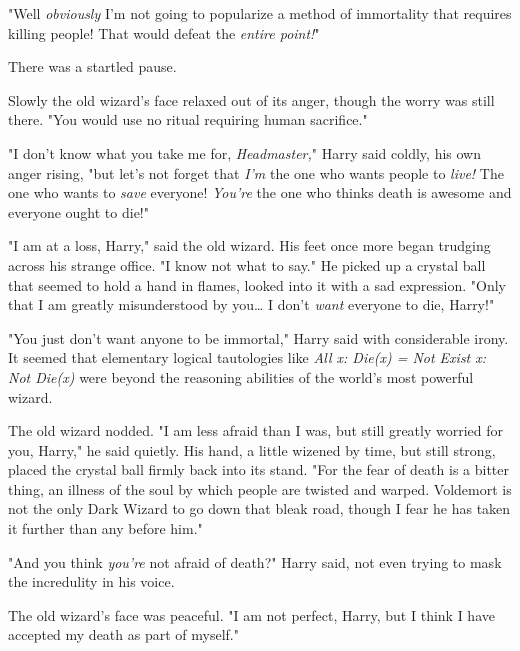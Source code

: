 "Well \emph{obviously} I'm not going to popularize a method of immortality that 
requires killing people! That would defeat the \emph{entire point!}"

There was a startled pause.

Slowly the old wizard's face relaxed out of its anger, though the worry was 
still there. "You would use no ritual requiring human sacrifice."

"I don't know what you take me for, \emph{Headmaster,}" Harry said coldly, his 
own anger rising, "but let's not forget that \emph{I'm} the one who wants 
people to \emph{live!} The one who wants to \emph{save} everyone! \emph{You're} 
the one who thinks death is awesome and everyone ought to die!"

"I am at a loss, Harry," said the old wizard. His feet once more began trudging 
across his strange office. "I know not what to say." He picked up a crystal 
ball that seemed to hold a hand in flames, looked into it with a sad 
expression. "Only that I am greatly misunderstood by you{\ldots} I don't 
\emph{want} everyone to die, Harry!"

"You just don't want anyone to be immortal," Harry said with considerable 
irony. It seemed that elementary logical tautologies like \emph{All x: Die(x) = 
Not Exist x: Not Die(x)} were beyond the reasoning abilities of the world's 
most powerful wizard.

The old wizard nodded. "I am less afraid than I was, but still greatly worried 
for you, Harry," he said quietly. His hand, a little wizened by time, but still 
strong, placed the crystal ball firmly back into its stand. "For the fear of 
death is a bitter thing, an illness of the soul by which people are twisted and 
warped. Voldemort is not the only Dark Wizard to go down that bleak road, 
though I fear he has taken it further than any before him."

"And you think \emph{you're} not afraid of death?" Harry said, not even trying 
to mask the incredulity in his voice.

The old wizard's face was peaceful. "I am not perfect, Harry, but I think I 
have accepted my death as part of myself."


